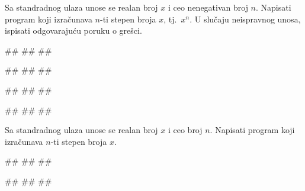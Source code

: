 \begin{Exercise}[label=PET_06] 
 Sa standradnog ulaza unose se realan broj $x$ i ceo nenegativan broj
 $n$. Napisati program koji izračunava $n$-ti stepen broja $x$,
 tj.~$x^n$.
 U slučaju neispravnog unosa, ispisati odgovarajuću poruku o grešci.
 
\begin{miditest}
\begin{upotreba}{1}
#\naslovInt#
##
##
\end{upotreba}
\end{miditest}
\begin{miditest}
\begin{upotreba}{2}
#\naslovInt#
##
##
\end{upotreba}
\end{miditest}

\begin{miditest}
\begin{upotreba}{3}
#\naslovInt#
##
##
\end{upotreba}
\end{miditest}
\begin{miditest}
\begin{upotreba}{4}
#\naslovInt#
##
##
\end{upotreba}
\end{miditest}

\end{Exercise}
\ifresenja
\begin{Answer}[ref=PET_06]
\end{Answer}
\fi

\begin{Exercise}[label=PET_07]
 Sa standradnog ulaza unose se realan broj $x$ i ceo broj
 $n$. Napisati program koji izračunava $n$-ti stepen broja $x$. 
 
\begin{miditest}
\begin{upotreba}{1}
#\naslovInt#
##
##
\end{upotreba}
\end{miditest}
\begin{miditest}
\begin{upotreba}{2}
#\naslovInt#
##
##
\end{upotreba}
\end{miditest}
\end{Exercise}
\ifresenja
\begin{Answer}[ref=PET_07]
\end{Answer}
\fi


